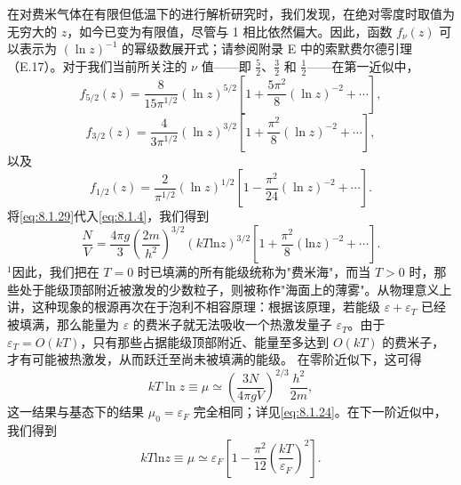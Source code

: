 在对费米气体在有限但低温下的进行解析研究时，我们发现，在绝对零度时取值为无穷大的 \(z\)，如今已变为有限值，尽管与 1 相比依然偏大。因此，函数 \(f_{\nu}(z)\) 可以表示为 \((\ln z)^{-1}\) 的幂级数展开式；请参阅附录 E 中的索默费尔德引理（E.17）。对于我们当前所关注的 \(\nu\) 值——即 \(\frac{5}{2}\)、\(\frac{3}{2}\) 和 \(\frac{1}{2}\)——在第一近似中，
\begin{equation}\tag{8.1.28}\label{eq:8.1.28}
f _ { 5 / 2 } ( z ) = \frac { 8 } { 15 \pi ^{1 / 2} } ( \ln z ) ^{5 / 2} \left[ 1 + \frac { 5 \pi ^{2} } { 8 } ( \ln z ) ^{- 2} + \cdots \right] ,
\end{equation}
\begin{equation}\tag{8.1.29}\label{eq:8.1.29}
f _ { 3 / 2 } ( z ) = \frac { 4 } { 3 \pi ^{1 / 2} } ( \ln z ) ^{3 / 2} \left[ 1 + \frac { \pi ^{2} } { 8 } ( \ln z ) ^{- 2} + \cdots \right] ,
\end{equation}
以及
\begin{equation}\tag{8.1.30}\label{eq:8.1.30}
f _ { 1 / 2 } ( z ) = \frac { 2 } { \pi ^{1 / 2} } ( \ln z ) ^{1 / 2} \left[ 1 - \frac { \pi ^{2} } { 24 } ( \ln z ) ^{- 2} + \cdots \right] .
\end{equation}
将\autoref{eq:8.1.29}代入\autoref{eq:8.1.4}，我们得到
\begin{equation}\tag{8.1.31}\label{eq:8.1.31}
\frac { N } { V } = \frac { 4 \pi g } { 3 } \left( \frac { 2 m } { h ^{2} } \right) ^{3 / 2} ( k T \mathrm { l n } z ) ^{3 / 2} \left[ 1 + \frac { \pi ^{2} } { 8 } ( \mathrm { l n } z ) ^{- 2} + \cdots \right] .
\end{equation}
\(^{1}\)因此，我们把在 \(T=0\) 时已填满的所有能级统称为"费米海"，而当 \(T>0\) 时，那些处于能级顶部附近被激发的少数粒子，则被称作"海面上的薄雾"。从物理意义上讲，这种现象的根源再次在于泡利不相容原理：根据该原理，若能级 \(\varepsilon+\varepsilon_{T}\) 已经被填满，那么能量为 \(\varepsilon\) 的费米子就无法吸收一个热激发量子 \(\varepsilon_{T}\)。由于 \(\varepsilon_{T}=O(kT)\)，只有那些占据能级顶部附近、能量至多达到 \(O(kT)\) 的费米子，才有可能被热激发，从而跃迁至尚未被填满的能级。
在零阶近似下，这可得
\begin{equation}\tag{8.1.32}\label{eq:8.1.32}
k T \ln z \equiv \mu \simeq \left( \frac { 3 N } { 4 \pi g V } \right) ^{2 / 3} \frac { h ^{2} } { 2 m } ,
\end{equation}
这一结果与基态下的结果 \(\mu_{0}=\varepsilon_{F}\) 完全相同；详见\autoref{eq:8.1.24}。在下一阶近似中，我们得到
\begin{equation}\tag{8.1.33}\label{eq:8.1.33}
k T \mathrm { l n } z \equiv \mu \simeq \varepsilon _ { F } \left[ 1 - \frac { \pi ^{2} } { 12 } \left( \frac { k T } { \varepsilon _ { F } } \right) ^{2} \right] .
\end{equation}
